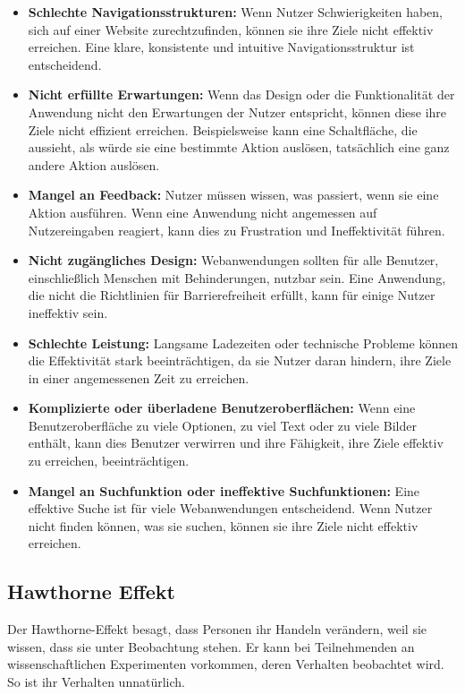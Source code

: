 \begin{itemize}
    \item \textbf{Schlechte Navigationsstrukturen:} Wenn Nutzer Schwierigkeiten haben, sich auf einer Website zurechtzufinden, können sie ihre Ziele nicht effektiv erreichen. Eine klare, konsistente und intuitive Navigationsstruktur ist entscheidend.
    \item \textbf{Nicht erfüllte Erwartungen:} Wenn das Design oder die Funktionalität der Anwendung nicht den Erwartungen der Nutzer entspricht, können diese ihre Ziele nicht effizient erreichen. Beispielsweise kann eine Schaltfläche, die aussieht, als würde sie eine bestimmte Aktion auslösen, tatsächlich eine ganz andere Aktion auslösen.
    \item \textbf{Mangel an Feedback:} Nutzer müssen wissen, was passiert, wenn sie eine Aktion ausführen. Wenn eine Anwendung nicht angemessen auf Nutzereingaben reagiert, kann dies zu Frustration und Ineffektivität führen.
    \item \textbf{Nicht zugängliches Design:} Webanwendungen sollten für alle Benutzer, einschließlich Menschen mit Behinderungen, nutzbar sein. Eine Anwendung, die nicht die Richtlinien für Barrierefreiheit erfüllt, kann für einige Nutzer ineffektiv sein.
    \item \textbf{Schlechte Leistung:} Langsame Ladezeiten oder technische Probleme können die Effektivität stark beeinträchtigen, da sie Nutzer daran hindern, ihre Ziele in einer angemessenen Zeit zu erreichen.
    \item \textbf{Komplizierte oder überladene Benutzeroberflächen:} Wenn eine Benutzeroberfläche zu viele Optionen, zu viel Text oder zu viele Bilder enthält, kann dies Benutzer verwirren und ihre Fähigkeit, ihre Ziele effektiv zu erreichen, beeinträchtigen.
    \item \textbf{Mangel an Suchfunktion oder ineffektive Suchfunktionen:} Eine effektive Suche ist für viele Webanwendungen entscheidend. Wenn Nutzer nicht finden können, was sie suchen, können sie ihre Ziele nicht effektiv erreichen.
\end{itemize}

\subsection{Hawthorne Effekt}
Der Hawthorne-Effekt besagt, dass Personen ihr Handeln verändern, weil sie wissen, dass sie unter Beobachtung stehen. Er kann bei Teilnehmenden an wissenschaftlichen Experimenten vorkommen, deren Verhalten beobachtet wird. So ist ihr Verhalten unnatürlich.

